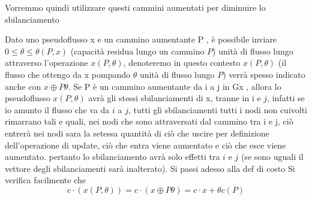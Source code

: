 
  Vorremmo quindi utilizzare questi cammini aumentati per diminuire lo sbilanciamento 

  Dato uno pseudoflusso x e un cammino aumentante P , è
  possibile inviare $0 \leq \theta \leq \theta(P, x)$ (capacità residua lungo un cammino $P$) unità di flusso lungo attraverso l’operazione $x(P, \theta)$, denoteremo in questo contesto $ x(P, \theta) $ (il flusso che ottengo da x pompando $\theta$ unità di flusso lungo $P$) verrà spesso indicato anche con $x \oplus P \theta$. Se P è un cammino aumentante da i a j in Gx , allora lo pseudoflusso $x(P, \theta)$ avrà gli stessi sbilanciamenti di x, tranne in i e $j$, infatti se io amunto il flusso che va da $i$  a $j$, tutti gli sbilanciamenti tutti i nodi non cuivolti rimarrano tali e quali, nei nodi che sono attraversati dal cammino tra i e j, ciò entrerà nei nodi sara la setessa quantità di ciò che uscire per definizione dell'operazione di update, ciò che entra viene aumentato e ciò che esce viene aumentato. pertanto lo sbilanciamento avrà solo effetti tra $i$ e $j$ (se sono uguali il vettore degli sbilanciamenti sarà inalterato). Si passi adesso alla def di costo
  Si verifica facilmente che 
  \[
    c · (x(P, \theta)) = c · (x \oplus P \theta) = c · x + \theta c(P )
  \]



